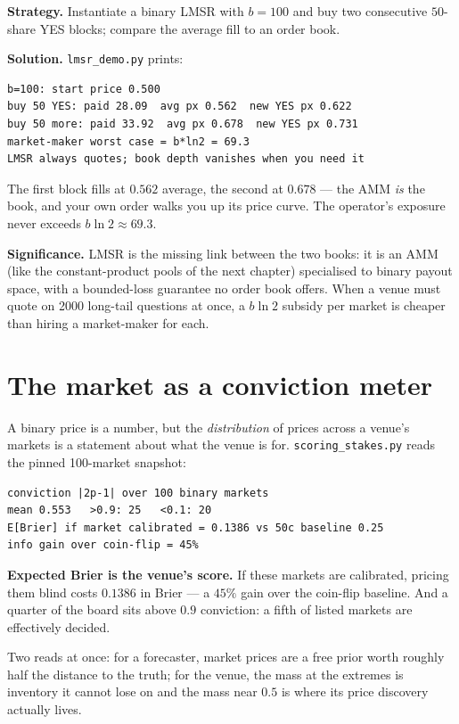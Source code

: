 \begin{example}\label{ex:lmsr}
\textbf{Strategy.} Instantiate a binary LMSR with $b=100$ and buy
two consecutive $50$-share YES blocks; compare the average fill to
an order book.

\textbf{Solution.} \texttt{lmsr\_demo.py} prints:
\begin{verbatim}
b=100: start price 0.500
buy 50 YES: paid 28.09  avg px 0.562  new YES px 0.622
buy 50 more: paid 33.92  avg px 0.678  new YES px 0.731
market-maker worst case = b*ln2 = 69.3
LMSR always quotes; book depth vanishes when you need it
\end{verbatim}
The first block fills at $0.562$ average, the second at $0.678$ ---
the AMM \emph{is} the book, and your own order walks you up its
price curve. The operator's exposure never exceeds
$b\ln 2 \approx 69.3$.

\textbf{Significance.} LMSR is the missing link between the two
books: it is an AMM (like the constant-product pools of the next
chapter) specialised to binary payout space, with a bounded-loss
guarantee no order book offers. When a venue must quote on 2000
long-tail questions at once, a $b\ln2$ subsidy per market is
cheaper than hiring a market-maker for each.
\end{example}


\section{The market as a conviction meter}\label{sec:conviction}
A binary price is a number, but the \emph{distribution} of prices
across a venue's markets is a statement about what the venue is
for. \texttt{scoring\_stakes.py} reads the pinned 100-market
snapshot:
\begin{verbatim}
conviction |2p-1| over 100 binary markets
mean 0.553   >0.9: 25   <0.1: 20
E[Brier] if market calibrated = 0.1386 vs 50c baseline 0.25
info gain over coin-flip = 45%
\end{verbatim}
\begin{example}\label{ex:conviction2}
\textbf{Expected Brier is the venue's score.} If these markets
are calibrated, pricing them blind costs $0.1386$ in Brier ---
a $45\%$ gain over the coin-flip baseline. And a quarter of the
board sits above $0.9$ conviction: a fifth of listed markets
are effectively decided.
\begin{solution}
Two reads at once: for a forecaster, market prices are a free
prior worth roughly half the distance to the truth; for the
venue, the mass at the extremes is inventory it cannot lose on
and the mass near $0.5$ is where its price discovery actually
lives.
\end{solution}
\end{example}
